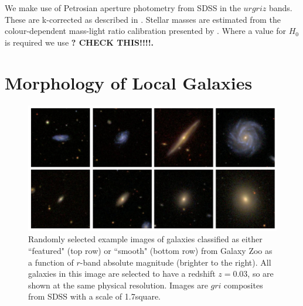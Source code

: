 \documentclass[usenatbib]{mn2e}
\newcommand{\ie}{{\it i.e.}}
\begin{document}
We make use of Petrosian aperture photometry from SDSS in the $urgriz$ bands. These are k-corrected as described in \citet{Bamford2009}. Stellar masses are estimated from the colour-dependent mass-light ratio calibration presented by \citet{Baldry2008}. Where a value for $H_0$ is required we use {\bf ? CHECK THIS!!!!.}

\section{Morphology of Local Galaxies} \label{demographics}



\begin{figure}
\includegraphics[width=160mm]{example1.png}
\caption{Randomly selected example images of galaxies classified as either ``featured" (top row) or ``smooth" (bottom row) from Galaxy Zoo as a function of $r$-band absolute magnitude (brighter to the right).  All galaxies in this image are selected to have a redshift $z=0.03$, so are shown at the same physical resolution. Images are $gri$ composites from SDSS with a scale of 1.7\arcmin square.  \label{examples}}
\end{figure}
\end{document}
